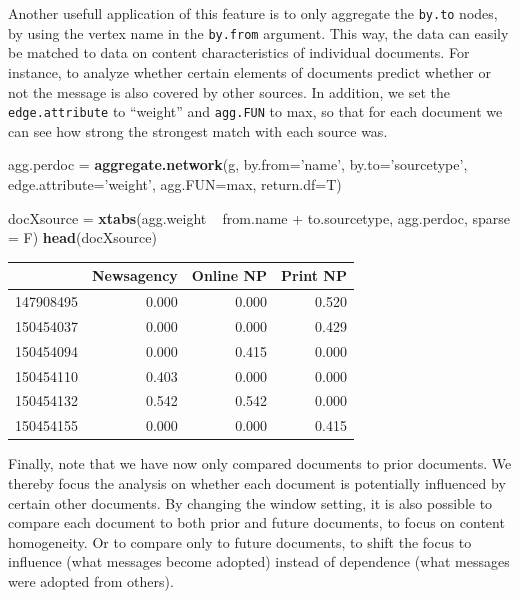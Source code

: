 \documentclass[]{article}
\newenvironment{Shaded}{\begin{snugshade}}{\end{snugshade}}
\newcommand{\KeywordTok}[1]{\textcolor[rgb]{0.13,0.29,0.53}{\textbf{{#1}}}}
\newcommand{\DataTypeTok}[1]{\textcolor[rgb]{0.13,0.29,0.53}{{#1}}}
\newcommand{\StringTok}[1]{\textcolor[rgb]{0.31,0.60,0.02}{{#1}}}
\newcommand{\NormalTok}[1]{{#1}}
\begin{document}
Another usefull application of this feature is to only aggregate the
\texttt{by.to} nodes, by using the vertex name in the \texttt{by.from}
argument. This way, the data can easily be matched to data on content
characteristics of individual documents. For instance, to analyze
whether certain elements of documents predict whether or not the message
is also covered by other sources. In addition, we set the
\texttt{edge.attribute} to ``weight'' and \texttt{agg.FUN} to max, so
that for each document we can see how strong the strongest match with
each source was.

\begin{Shaded}
\begin{Highlighting}[]
\NormalTok{agg.perdoc =}\StringTok{ }\KeywordTok{aggregate.network}\NormalTok{(g, }\DataTypeTok{by.from=}\StringTok{'name'}\NormalTok{, }\DataTypeTok{by.to=}\StringTok{'sourcetype'}\NormalTok{, }
                                  \DataTypeTok{edge.attribute=}\StringTok{'weight'}\NormalTok{, }\DataTypeTok{agg.FUN=}\NormalTok{max, }
                                  \DataTypeTok{return.df=}\NormalTok{T)}

\NormalTok{docXsource =}\StringTok{ }\KeywordTok{xtabs}\NormalTok{(agg.weight ~}\StringTok{ }\NormalTok{from.name +}\StringTok{ }\NormalTok{to.sourcetype, agg.perdoc, }\DataTypeTok{sparse =} \NormalTok{F)}
\KeywordTok{head}\NormalTok{(docXsource)}
\end{Highlighting}
\end{Shaded}

\begin{longtable}[c]{@{}lrrr@{}}
\toprule
& Newsagency & Online NP & Print NP\tabularnewline
\midrule
\endhead
147908495 & 0.000 & 0.000 & 0.520\tabularnewline
150454037 & 0.000 & 0.000 & 0.429\tabularnewline
150454094 & 0.000 & 0.415 & 0.000\tabularnewline
150454110 & 0.403 & 0.000 & 0.000\tabularnewline
150454132 & 0.542 & 0.542 & 0.000\tabularnewline
150454155 & 0.000 & 0.000 & 0.415\tabularnewline
\bottomrule
\end{longtable}

Finally, note that we have now only compared documents to prior
documents. We thereby focus the analysis on whether each document is
potentially influenced by certain other documents. By changing the
window setting, it is also possible to compare each document to both
prior and future documents, to focus on content homogeneity. Or to
compare only to future documents, to shift the focus to influence (what
messages become adopted) instead of dependence (what messages were
adopted from others).
\end{document}
